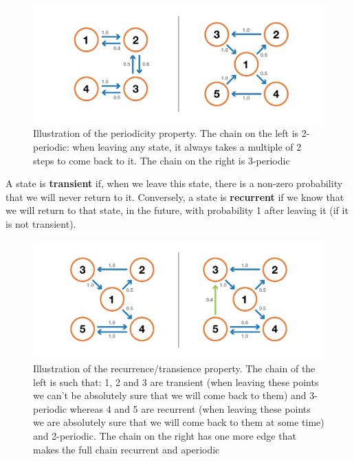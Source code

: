 \begin{figure}[h]
    \centering
\includegraphics[width=\textwidth]{pic/p05c07-snip06.png}
    \caption[Illustration of the periodicity property]{Illustration of the periodicity property. The chain on the left is 2-periodic: when leaving any state, it always takes a multiple of 2 steps to come back to it. The chain on the right is 3-periodic}
    \label{fig:p05c07-snip06}
\end{figure}

A state is \textbf{transient} if, when we leave this state, there is a non-zero probability that we will never return to it. Conversely, a state is \textbf{recurrent} if we know that we will return to that state, in the future, with probability 1 after leaving it (if it is not transient).



\begin{figure}[h]
    \centering
\includegraphics[width=\textwidth]{pic/p05c07-snip07.png}
    \caption[Illustration of the recurrence/transience property.]{Illustration of the recurrence/transience property. The chain of the left is such that: 1, 2 and 3 are transient (when leaving these points we can't be absolutely sure that we will come back to them) and 3-periodic whereas 4 and 5 are recurrent (when leaving these points we are absolutely sure that we will come back to them at some time) and 2-periodic. The chain on the right has one more edge that makes the full chain recurrent and aperiodic}
    \label{fig:p05c07-snip07}
\end{figure}

